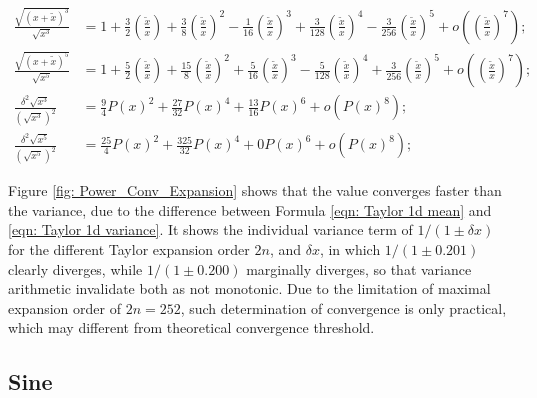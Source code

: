 \documentclass[twoside]{article}
\numberwithin{equation}{section}
\begin{document}
\begin{align}
\label{eqn: square root^3 Taylor}
\frac{\sqrt{(x + \tilde{x})^3}}{\sqrt{x^3}} &= 1 + \frac{3}{2} (\frac{\tilde{x}}{x}) + \frac{3}{8} (\frac{\tilde{x}}{x})^2 - \frac{1}{16} (\frac{\tilde{x}}{x})^3 
		+ \frac{3}{128} (\frac{\tilde{x}}{x})^4 - \frac{3}{256} (\frac{\tilde{x}}{x})^5 + o((\frac{\tilde{x}}{x})^7); \\
\label{eqn: square root^5 Taylor}
\frac{\sqrt{(x + \tilde{x})^5}}{\sqrt{x^5}} &= 1 + \frac{5}{2} (\frac{\tilde{x}}{x}) + \frac{15}{8} (\frac{\tilde{x}}{x})^2 + \frac{5}{16} (\frac{\tilde{x}}{x})^3 
		- \frac{5}{128} (\frac{\tilde{x}}{x})^4 + \frac{3}{256} (\frac{\tilde{x}}{x})^5 + o((\frac{\tilde{x}}{x})^7); \\
\label{eqn: square root^3 precision}
\frac{\delta^2 \sqrt{x^3}}{(\sqrt{x^3})^2} &=  \frac{9}{4} P(x)^2 + \frac{27}{32} P(x)^4 + \frac{13}{16} P(x)^6 + o(P(x)^8); \\
\label{eqn: square root^5 precision}
\frac{\delta^2 \sqrt{x^5}}{(\sqrt{x^5})^2} &= \frac{25}{4} P(x)^2 + \frac{325}{32} P(x)^4 + 0 P(x)^6 + o(P(x)^8);
\end{align}

Figure \ref{fig: Power_Conv_Expansion} shows that the value converges faster than the variance, due to the difference between Formula \eqref{eqn: Taylor 1d mean} and \eqref{eqn: Taylor 1d variance}.
It shows the individual variance term of $1/(1 \pm \delta x)$ for the different Taylor expansion order $2n$, and $\delta x$, in which $1/(1 \pm 0.201)$ clearly diverges, while $1/(1 \pm 0.200)$ marginally diverges, so that variance arithmetic invalidate both as not monotonic.
Due to the limitation of maximal expansion order of $2n=252$, such determination of convergence is only practical, which may different from theoretical convergence threshold. 





\subsection{Sine}
\end{document}
